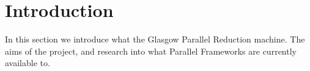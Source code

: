 \chapter{Introduction}

In this section we introduce what the Glasgow Parallel Reduction machine. The aims of the project, 
and research into what Parallel Frameworks are currently available to.






